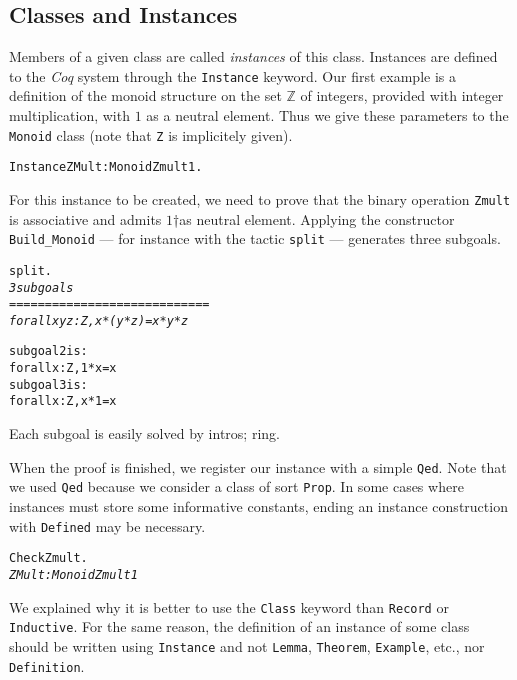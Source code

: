 \documentclass[a4]{report}
\newcommand{\coq}{\mbox{\emph{Coq}}}
\begin{document}
\subsection{Classes and Instances}
Members of a given class are called \emph{instances} of this class.
Instances are defined to the {\coq} system through the \texttt{Instance} keyword. Our first example is a definition of the monoid structure on the set
$\mathbb{Z}$ of integers, provided with integer multiplication, with $1$ as 
a neutral element. Thus we give these parameters to the \texttt{Monoid} class
(note that \texttt{Z} is implicitely given).

\begin{alltt}
Instance ZMult : Monoid  Zmult 1.
\end{alltt}

For this instance to be created, we need to prove that the binary operation
\texttt{Zmult} is associative and admits $1$†as neutral element.
Applying the constructor \texttt{Build\_Monoid} --- for instance with the tactic \texttt{split} --- generates three subgoals.
 

\begin{alltt}
split.\it\color{answercolor}
3 subgoals
  ============================
   forall x y z : Z, x * (y * z) = x * y * z

subgoal 2 is:
 forall x : Z, 1 * x = x
subgoal 3 is:
 forall x : Z, x * 1 = x\tt\color{black}
\end{alltt}

 Each subgoal is easily solved by \textcolor{taccolor}{intros; ring}.

When the proof is finished, we register our instance with a simple \texttt{Qed}.
Note that we used \texttt{Qed} because we consider a class of sort \texttt{Prop}. In some cases where instances must store some informative constants, ending
an instance construction with \texttt{Defined} may be necessary.


\begin{alltt}
Check Zmult.\it\color{red}
ZMult : Monoid Zmult 1
\end{alltt}

 We explained  why it is better to use
the \texttt{Class} keyword than \texttt{Record} or \texttt{Inductive}.
For the same reason, the definition of an instance of some class should
be written using \texttt{Instance} and not \texttt{Lemma}, \texttt{Theorem},
\texttt{Example}, etc., nor \texttt{Definition}.
\end{document}
